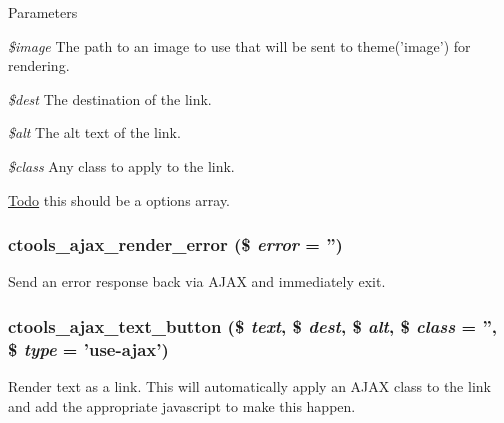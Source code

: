 \begin{DoxyParams}{Parameters}
\item[{\em \$image}]The path to an image to use that will be sent to theme('image') for rendering. \item[{\em \$dest}]The destination of the link. \item[{\em \$alt}]The alt text of the link. \item[{\em \$class}]Any class to apply to the link. \end{DoxyParams}
\begin{Desc}
\item[\hyperlink{todo__todo000032}{Todo}]this should be a options array. \end{Desc}
\hypertarget{profiles_2dosomething_2modules_2contrib_2ctools_2includes_2ajax_8inc_ab41cb38da1e7523e8697f9197cc6244e}{
\subsubsection[{ctools\_\-ajax\_\-render\_\-error}]{\setlength{\rightskip}{0pt plus 5cm}ctools\_\-ajax\_\-render\_\-error (\$ {\em error} = {\ttfamily ''})}}
\label{profiles_2dosomething_2modules_2contrib_2ctools_2includes_2ajax_8inc_ab41cb38da1e7523e8697f9197cc6244e}
Send an error response back via AJAX and immediately exit. \hypertarget{profiles_2dosomething_2modules_2contrib_2ctools_2includes_2ajax_8inc_aa20aff28acfb85cc21e49727d3126aad}{
\subsubsection[{ctools\_\-ajax\_\-text\_\-button}]{\setlength{\rightskip}{0pt plus 5cm}ctools\_\-ajax\_\-text\_\-button (\$ {\em text}, \/  \$ {\em dest}, \/  \$ {\em alt}, \/  \$ {\em class} = {\ttfamily ''}, \/  \$ {\em type} = {\ttfamily 'use-\/ajax'})}}
\label{profiles_2dosomething_2modules_2contrib_2ctools_2includes_2ajax_8inc_aa20aff28acfb85cc21e49727d3126aad}
Render text as a link. This will automatically apply an AJAX class to the link and add the appropriate javascript to make this happen.

